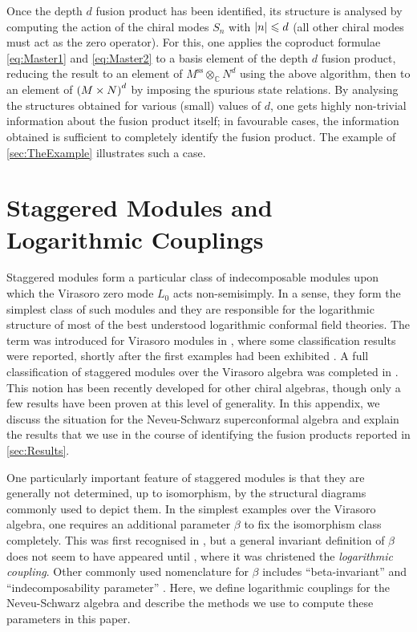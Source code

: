 \documentclass[a4paper,reqno,12pt]{report}
\theoremstyle{definition}
\numberwithin{equation}{section}
\let\originalleft\left     %
\let\originalright\right
\renewcommand{\left}{\mathopen{}\mathclose\bgroup\originalleft}
\renewcommand{\right}{\aftergroup\egroup\originalright}
\newcommand{\brac}[1]{\left( #1 \right)}
\newcommand{\abs}[1]{\left\lvert #1 \right\rvert}
\newcommand{\CC}{\mathbb{C}}
\newcommand{\spsub}[1]{#1^{\text{ss}}}       %
\newcommand{\lcfts}{logarithmic conformal field theories}
\newcommand{\ns}{Neveu-Schwarz}
\renewcommand{\le}{\leqslant}
\theoremstyle{plain}
\begin{document}
Once the depth $d$ fusion product has been identified, its structure is analysed by computing the action of the chiral modes $S_n$ with $\abs{n} \le d$ (all other chiral modes must act as the zero operator).  For this, one applies the coproduct formulae \eqref{eq:Master1} and \eqref{eq:Master2} to a basis element of the depth $d$ fusion product, reducing the result to an element of $\spsub{M} \otimes_{\CC} N^d$ using the above algorithm, then to an element of $\brac{M \times N}^d$ by imposing the spurious state relations.  By analysing the structures obtained for various (small) values of $d$, one gets highly non-trivial information about the fusion product itself; in favourable cases, the information obtained is sufficient to completely identify the fusion product.  The example of \cref{sec:TheExample} illustrates such a case.

\section{Staggered Modules and Logarithmic Couplings} \label{app:StagMod}

Staggered modules form a particular class of indecomposable modules upon which the Virasoro zero mode $L_0$ acts non-semisimply.  In a sense, they form the simplest class of such modules and they are responsible for the logarithmic structure of most of the best understood \lcfts{}.  The term was introduced for Virasoro modules in \cite{RohRed96}, where some classification results were reported, shortly after the first examples had been exhibited \cite{GabInd96}.  A full classification of staggered modules over the Virasoro algebra was completed in \cite{RidSta09}.  This notion has been recently developed \cite{CreLog13} for other chiral algebras, though only a few results have been proven at this level of generality.  In this appendix, we discuss the situation for the \ns{} superconformal algebra and explain the results that we use in the course of identifying the fusion products reported in \cref{sec:Results}.

One particularly important feature of staggered modules is that they are generally not determined, up to isomorphism, by the structural diagrams commonly used to depict them.  In the simplest examples over the Virasoro algebra, one requires an additional parameter $\beta$ to fix the isomorphism class completely.  This was first recognised in \cite{GabInd96}, but a general invariant definition of $\beta$ does not seem to have appeared until \cite{RidPer07}, where it was christened the \emph{logarithmic coupling}.  Other commonly used nomenclature for $\beta$ includes ``beta-invariant'' \cite{RidSta09} and ``indecomposability parameter'' \cite{VasInd11}.  Here, we define logarithmic couplings for the \ns{} algebra and describe the methods we use to compute these parameters in this paper.
\end{document}
